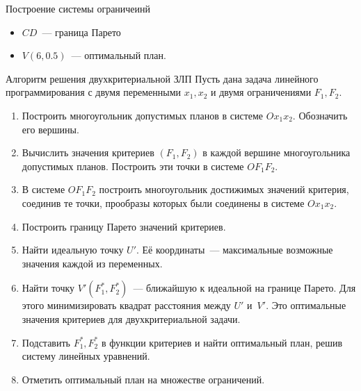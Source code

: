 \documentclass[unicode,11pt,notheorems,xcolor=table]{beamer}
\begin{document}
\begin{frame}{Построение системы ограничеинй}
    \begin{itemize}
        \item \alert{$CD$}~--- граница Парето
        \item \alert{$V(6,0.5)$}~--- оптимальный план.
    \end{itemize}
\end{frame}
\begin{frame}[allowframebreaks]{Алгоритм решения двухкритериальной ЗЛП}{}
    Пусть дана задача линейного программирования с двумя переменными $x_1,x_2$ и двумя ограничениями $F_1,F_2$.

    \begin{enumerate}
        \item Построить многоугольник допустимых планов  в системе $Ox_1x_2$. Обозначить его вершины.
        \item Вычислить значения критериев $(F_1,F_2)$ в каждой вершине многоугольника допустимых планов. Построить эти точки в системе $OF_1F_2$.
        \item В системе $OF_1F_2$ построить многоугольник достижимых значений критерия, соединив те точки, прообразы которых были соединены в системе $Ox_1x_2$. 
        \item Построить границу Парето значений критериев.
        \framebreak
        \item Найти идеальную точку $U'$. Её координаты~--- максимальные возможные значения каждой из переменных.
        \item Найти точку $V'(F^*_1,F^*_2)$~--- ближайшую к идеальной на границе Парето. Для этого минимизировать квадрат расстояния между $U'$ и~$V'$. \alert{Это оптимальные значения критериев для двухкритериальной задачи.}
        \item Подставить $F^*_1,F^*_2$ в функции критериев и  \alert{найти оптимальный план}, решив систему линейных уравнений.
        \item Отметить оптимальный план на множестве ограничений.
    \end{enumerate}
\end{frame}
\end{document}
